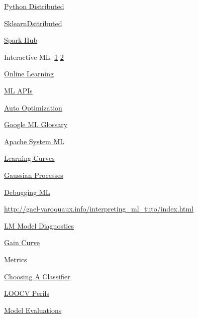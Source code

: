 \documentclass[]{book}
\begin{document}
\href{https://speakerdeck.com/seanoc/a-tour-of-large-scale-data-analysis-tools-in-python}{Python
Distributed}

\href{https://alexperrier.github.io/jekyll/update/2016/03/16/out-of-core-scikit-boston-meetup.html\#/}{SklearnDsitributed}

\href{https://sparkhub.databricks.com/}{Spark Hub}

Interactive ML:
\href{https://channel9.msdn.com/Events/useR-international-R-User-conference/useR2016/Interactive-Naive-Bayes-using-Shiny-Text-Retrieval-Classification-Quantification}{1}
\textbar{}
\href{https://nuit-blanche.blogspot.com/2017/02/saturday-morning-videos-interactive.html}{2}

\href{http://scikit-learn.org/stable/modules/generated/sklearn.linear_model.PassiveAggressiveRegressor.html}{Online
Learning}

\href{http://www.kdnuggets.com/2015/12/machine-learning-data-science-apis.html}{ML
APIs}

\href{https://sigopt.com/}{Auto Optimization}

\href{https://developers.google.com/machine-learning/glossary/}{Google
ML Glossary}

\href{https://systemml.apache.org}{Apache System ML}

\href{http://www.ritchieng.com/machinelearning-learning-curve/}{Learning
Curves}

\href{http://scikit-learn.org/stable/modules/gaussian_process.html}{Gaussian
Processes}

\href{http://nlpers.blogspot.com/2016/08/debugging-machine-learning.html}{Debugging
ML}

\url{http://gael-varoquaux.info/interpreting_ml_tuto/index.html}

\href{http://mpastell.com/2013/04/19/python_regression/}{LM Model
Diagnostics}

\href{https://www.rdocumentation.org/packages/WVPlots/versions/0.2.6/topics/GainCurvePlot}{Gain
Curve}

\href{https://www.analyticsvidhya.com/blog/2016/02/7-important-model-evaluation-error-metrics/}{Metrics}

\href{http://blog.echen.me/2011/04/27/choosing-a-machine-learning-classifier/}{Choosing
A Classifier}

\href{http://www.russpoldrack.org/2012/12/the-perils-of-leave-one-out.html}{LOOCV
Perils}

\href{http://www.win-vector.com/blog/2016/12/be-careful-evaluating-model-predictions/}{Model
Evaluations}
\end{document}
